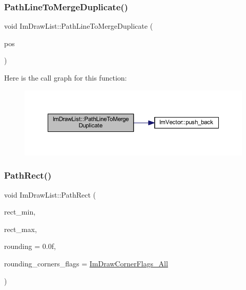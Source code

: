 \subsubsection{\texorpdfstring{Path\+Line\+To\+Merge\+Duplicate()}{PathLineToMergeDuplicate()}}
{\footnotesize\ttfamily void Im\+Draw\+List\+::\+Path\+Line\+To\+Merge\+Duplicate (\begin{DoxyParamCaption}\item[{const \mbox{\hyperlink{struct_im_vec2}{Im\+Vec2}} \&}]{pos }\end{DoxyParamCaption})\hspace{0.3cm}{\ttfamily [inline]}}

Here is the call graph for this function\+:
\nopagebreak
\begin{figure}[H]
\begin{center}
\leavevmode
\includegraphics[width=350pt]{struct_im_draw_list_aa3dd11945fb62495f8b9e1392ed724e3_cgraph}
\end{center}
\end{figure}
\mbox{\label{struct_im_draw_list_a6664e5392e7cca67fd95c4dc0eae7569}} 
\subsubsection{\texorpdfstring{Path\+Rect()}{PathRect()}}
{\footnotesize\ttfamily void Im\+Draw\+List\+::\+Path\+Rect (\begin{DoxyParamCaption}\item[{const \mbox{\hyperlink{struct_im_vec2}{Im\+Vec2}} \&}]{rect\+\_\+min,  }\item[{const \mbox{\hyperlink{struct_im_vec2}{Im\+Vec2}} \&}]{rect\+\_\+max,  }\item[{float}]{rounding = {\ttfamily 0.0f},  }\item[{int}]{rounding\+\_\+corners\+\_\+flags = {\ttfamily \mbox{\hyperlink{imgui_8h_ad3b7317312a7b22064ff6b6d00a54258a4e075323857172f48c44c3953f5b03df}{Im\+Draw\+Corner\+Flags\+\_\+\+All}}} }\end{DoxyParamCaption})}

